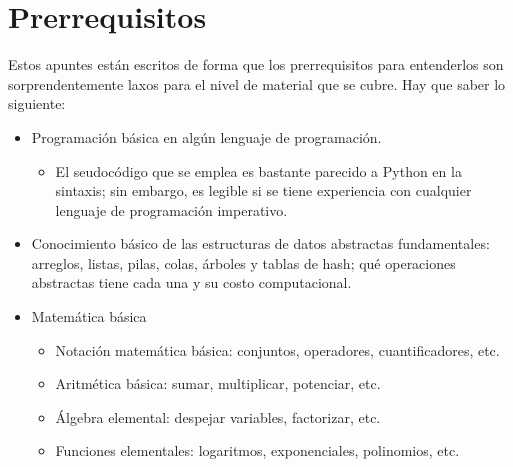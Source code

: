 \part*{Prerrequisitos}

Estos apuntes están escritos de forma que los prerrequisitos para entenderlos son sorprendentemente laxos para el nivel de material que se cubre. Hay que saber lo siguiente:
\begin{itemize}
  \item Programación básica en algún lenguaje de programación. 
  \begin{itemize}
    \item El seudocódigo que se emplea es bastante parecido a Python en la sintaxis; sin embargo, es legible si se tiene experiencia con cualquier lenguaje de programación imperativo.
  \end{itemize}
  \item Conocimiento básico de las estructuras de datos abstractas fundamentales: arreglos, listas, pilas, colas, árboles y tablas de hash; qué operaciones abstractas tiene cada una y su costo computacional. 
  \item Matemática básica
  \begin{itemize}
    \item Notación matemática básica: conjuntos, operadores, cuantificadores, etc.
    \item Aritmética básica: sumar, multiplicar, potenciar, etc.
    \item Álgebra elemental: despejar variables, factorizar, etc.
    \item Funciones elementales: logaritmos, exponenciales, polinomios, etc.
  \end{itemize}
\end{itemize}